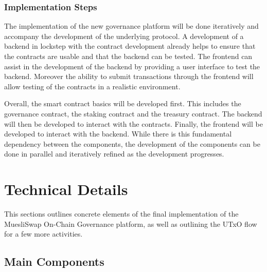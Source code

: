 \documentclass[11pt]{article}
\begin{document}
\subsubsection{Implementation Steps}

The implementation of the new governance platform will be done iteratively and accompany the development of the underlying protocol.
A development of a backend in lockstep with the contract development already helps to ensure that the contracts are usable and that the backend can be tested.
The frontend can assist in the development of the backend by providing a user interface to test the backend.
Moreover the ability to submit transactions through the frontend will allow testing of the contracts in a realistic environment.

Overall, the smart contract basics will be developed first.
This includes the governance contract, the staking contract and the treasury contract.
The backend will then be developed to interact with the contracts.
Finally, the frontend will be developed to interact with the backend.
While there is this fundamental dependency between the components, the development of the components can be done in parallel and iteratively refined as the development progresses.


\section{Technical Details}

This sections outlines concrete elements of the final implementation of the MuesliSwap On-Chain Governance platform,
as well as outlining the UTxO flow for a few more activities.

\subsection{Main Components}
\end{document}
